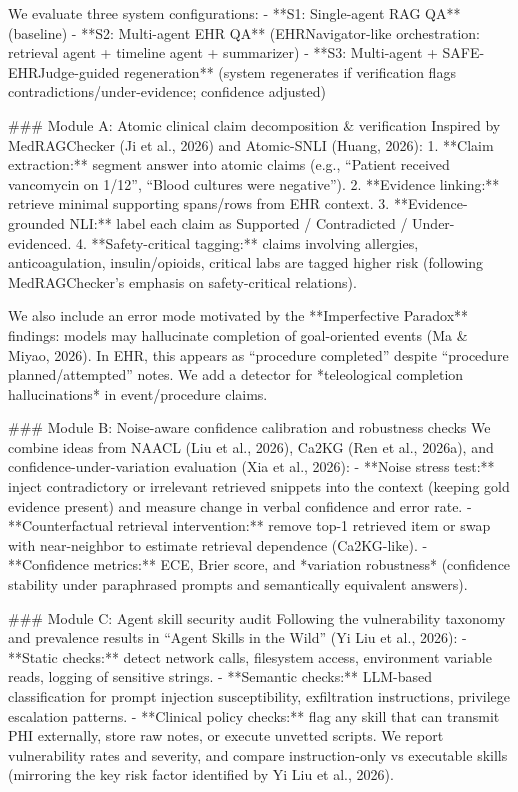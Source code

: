 We evaluate three system configurations:  
- **S1: Single-agent RAG QA** (baseline)  
- **S2: Multi-agent EHR QA** (EHRNavigator-like orchestration: retrieval agent + timeline agent + summarizer)  
- **S3: Multi-agent + SAFE-EHRJudge-guided regeneration** (system regenerates if verification flags contradictions/under-evidence; confidence adjusted)

### Module A: Atomic clinical claim decomposition & verification  
Inspired by MedRAGChecker (Ji et al., 2026) and Atomic-SNLI (Huang, 2026):  
1. **Claim extraction:** segment answer into atomic claims (e.g., “Patient received vancomycin on 1/12”, “Blood cultures were negative”).  
2. **Evidence linking:** retrieve minimal supporting spans/rows from EHR context.  
3. **Evidence-grounded NLI:** label each claim as Supported / Contradicted / Under-evidenced.  
4. **Safety-critical tagging:** claims involving allergies, anticoagulation, insulin/opioids, critical labs are tagged higher risk (following MedRAGChecker’s emphasis on safety-critical relations).

We also include an error mode motivated by the **Imperfective Paradox** findings: models may hallucinate completion of goal-oriented events (Ma & Miyao, 2026). In EHR, this appears as “procedure completed” despite “procedure planned/attempted” notes. We add a detector for *teleological completion hallucinations* in event/procedure claims.

### Module B: Noise-aware confidence calibration and robustness checks  
We combine ideas from NAACL (Liu et al., 2026), Ca2KG (Ren et al., 2026a), and confidence-under-variation evaluation (Xia et al., 2026):  
- **Noise stress test:** inject contradictory or irrelevant retrieved snippets into the context (keeping gold evidence present) and measure change in verbal confidence and error rate.  
- **Counterfactual retrieval intervention:** remove top-1 retrieved item or swap with near-neighbor to estimate retrieval dependence (Ca2KG-like).  
- **Confidence metrics:** ECE, Brier score, and *variation robustness* (confidence stability under paraphrased prompts and semantically equivalent answers).

### Module C: Agent skill security audit  
Following the vulnerability taxonomy and prevalence results in “Agent Skills in the Wild” (Yi Liu et al., 2026):  
- **Static checks:** detect network calls, filesystem access, environment variable reads, logging of sensitive strings.  
- **Semantic checks:** LLM-based classification for prompt injection susceptibility, exfiltration instructions, privilege escalation patterns.  
- **Clinical policy checks:** flag any skill that can transmit PHI externally, store raw notes, or execute unvetted scripts.  
We report vulnerability rates and severity, and compare instruction-only vs executable skills (mirroring the key risk factor identified by Yi Liu et al., 2026).

